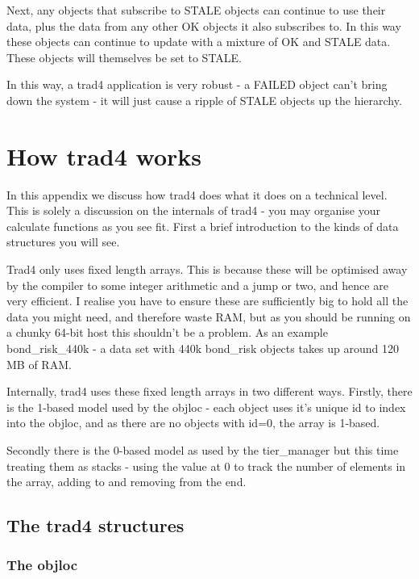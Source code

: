 \documentclass{report}
\begin{document}
Next, any objects that subscribe to STALE objects can continue to use their data, plus the data from any other OK objects it also subscribes to. In this way these objects can continue to update with a mixture of OK and STALE data. These objects will themselves be set to STALE.

In this way, a trad4 application is very robust - a FAILED object can't bring down the system - it will just cause a ripple of STALE objects up the hierarchy.

\appendix

\chapter{How trad4 works}

In this appendix we discuss how trad4 does what it does on a technical level. This is solely a discussion on the internals of trad4 - you may organise your calculate functions as you see fit.  First a brief introduction to the kinds of data structures you will see. 

Trad4 only uses fixed length arrays. This is because these will be optimised away by the compiler to some integer arithmetic and a jump or two, and hence are very efficient. I realise you have to ensure these are sufficiently big to hold all the data you might need, and therefore waste RAM, but as you should be running on a chunky 64-bit host this shouldn't be a problem. As an example bond_risk_440k - a data set with 440k bond_risk objects takes up around 120 MB of RAM. 

Internally, trad4 uses these fixed length arrays in two different ways.  Firstly, there is the 1-based model used by the objloc - each object uses it's unique id to index into the objloc, and as there are no objects with id=0, the array is 1-based.

Secondly there is the 0-based model as used by the tier_manager but this time treating them as stacks - using the value at 0 to track the number of elements in the array, adding to and removing from the end.

\section{The trad4 structures}

\subsection{The objloc}
\end{document}
